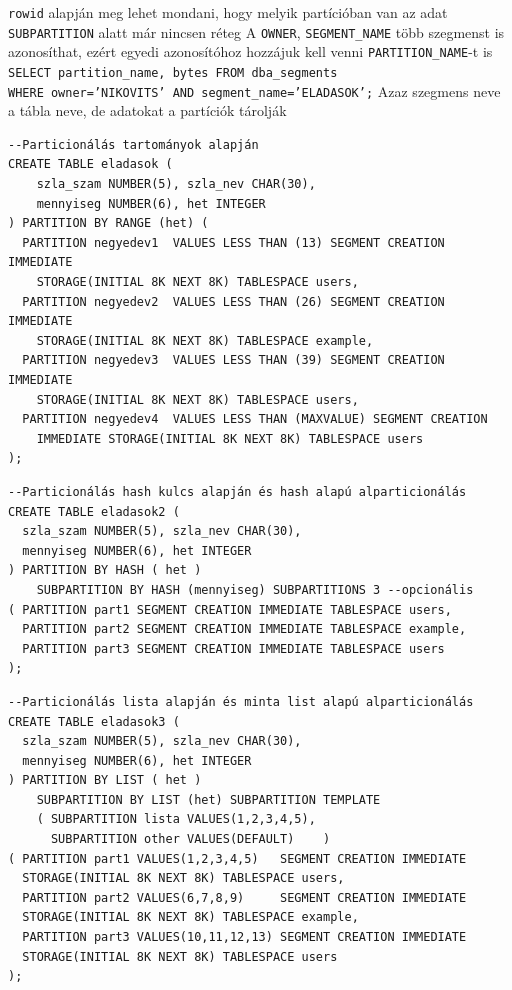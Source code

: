 \documentclass[12pt,a4paper]{article}
\begin{document}
\begin{outline}
	\1 \texttt{rowid} alapján meg lehet mondani, hogy melyik partícióban van az adat
	\1 \texttt{SUBPARTITION} alatt már nincsen réteg
	\1 A \texttt{OWNER}, \texttt{SEGMENT\_NAME} több szegmenst is azonosíthat, ezért egyedi azonosítóhoz hozzájuk kell venni \texttt{PARTITION\_NAME}-t is
		\2 \texttt{SELECT partition\_name, bytes FROM dba\_segments\\
			WHERE owner='NIKOVITS' AND segment\_name='ELADASOK';}
		\2 Azaz szegmens neve a tábla neve, de adatokat a partíciók tárolják
	\1 \begin{verbatim}
--Particionálás tartományok alapján
CREATE TABLE eladasok (
    szla_szam NUMBER(5), szla_nev CHAR(30),
    mennyiseg NUMBER(6), het INTEGER
) PARTITION BY RANGE (het) (
  PARTITION negyedev1  VALUES LESS THAN (13) SEGMENT CREATION IMMEDIATE 
    STORAGE(INITIAL 8K NEXT 8K) TABLESPACE users,
  PARTITION negyedev2  VALUES LESS THAN (26) SEGMENT CREATION IMMEDIATE 
    STORAGE(INITIAL 8K NEXT 8K) TABLESPACE example,
  PARTITION negyedev3  VALUES LESS THAN (39) SEGMENT CREATION IMMEDIATE  
    STORAGE(INITIAL 8K NEXT 8K) TABLESPACE users,
  PARTITION negyedev4  VALUES LESS THAN (MAXVALUE) SEGMENT CREATION
    IMMEDIATE STORAGE(INITIAL 8K NEXT 8K) TABLESPACE users
); \end{verbatim}
	\1 \begin{verbatim}
--Particionálás hash kulcs alapján és hash alapú alparticionálás
CREATE TABLE eladasok2 (
  szla_szam NUMBER(5), szla_nev CHAR(30),
  mennyiseg NUMBER(6), het INTEGER
) PARTITION BY HASH ( het )
    SUBPARTITION BY HASH (mennyiseg) SUBPARTITIONS 3 --opcionális
( PARTITION part1 SEGMENT CREATION IMMEDIATE TABLESPACE users, 
  PARTITION part2 SEGMENT CREATION IMMEDIATE TABLESPACE example, 
  PARTITION part3 SEGMENT CREATION IMMEDIATE TABLESPACE users
);
	\end{verbatim}
\pagebreak
	\1 \begin{verbatim}
--Particionálás lista alapján és minta list alapú alparticionálás
CREATE TABLE eladasok3 (
  szla_szam NUMBER(5), szla_nev CHAR(30), 
  mennyiseg NUMBER(6), het INTEGER
) PARTITION BY LIST ( het )
    SUBPARTITION BY LIST (het) SUBPARTITION TEMPLATE
    ( SUBPARTITION lista VALUES(1,2,3,4,5),
      SUBPARTITION other VALUES(DEFAULT)    )
( PARTITION part1 VALUES(1,2,3,4,5)   SEGMENT CREATION IMMEDIATE 
  STORAGE(INITIAL 8K NEXT 8K) TABLESPACE users, 
  PARTITION part2 VALUES(6,7,8,9)     SEGMENT CREATION IMMEDIATE 
  STORAGE(INITIAL 8K NEXT 8K) TABLESPACE example, 
  PARTITION part3 VALUES(10,11,12,13) SEGMENT CREATION IMMEDIATE 
  STORAGE(INITIAL 8K NEXT 8K) TABLESPACE users
);
	\end{verbatim}
\end{outline}
\end{document}
